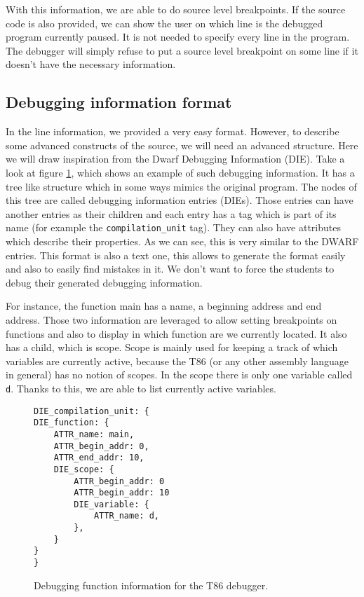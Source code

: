 With this information, we are able to do source level breakpoints. If the
source code is also provided, we can show the user on which line is the
debugged program currently paused. It is not needed to specify every line in
the program. The debugger will simply refuse to put a source level breakpoint
on some line if it doesn't have the necessary information.

\subsection{Debugging information format}
In the line information, we provided a very easy format. However, to describe
some advanced constructs of the source, we will need an advanced structure.
Here we will draw inspiration from the Dwarf Debugging Information (DIE). Take
a look at figure \ref{fig:t86dbg-die}, which shows an example of such debugging
information. It has a tree like structure which in some ways mimics the
original program. The nodes of this tree are called debugging information
entries (DIEs). Those entries can have another entries as their children and
each entry has a tag which is part of its name (for example the
\texttt{compilation\_unit} tag). They can also have attributes which describe
their properties. As we can see, this is very similar to the DWARF entries.
This format is also a text one, this allows to generate the format easily and
also to easily find mistakes in it. We don't want to force the students to
debug their generated debugging information.

For instance, the function main has a name, a beginning address and end
address. Those two information are leveraged to allow setting breakpoints on
functions and also to display in which function are we currently located.
It also has a child, which is scope. Scope is mainly used for keeping
a track of which variables are currently active, because the T86 (or
any other assembly language in general) has no notion of scopes.
In the scope there is only one variable called \texttt{d}. Thanks to this,
we are able to list currently active variables.

\begin{figure}
    \begin{lstlisting}
DIE_compilation_unit: {
DIE_function: {
    ATTR_name: main,
    ATTR_begin_addr: 0,
    ATTR_end_addr: 10,
    DIE_scope: {
        ATTR_begin_addr: 0
        ATTR_begin_addr: 10
        DIE_variable: {
            ATTR_name: d,
        },
    }
}
}
    \end{lstlisting}
    \caption{Debugging function information for the T86 debugger.}
    \label{fig:t86dbg-die}
\end{figure}

